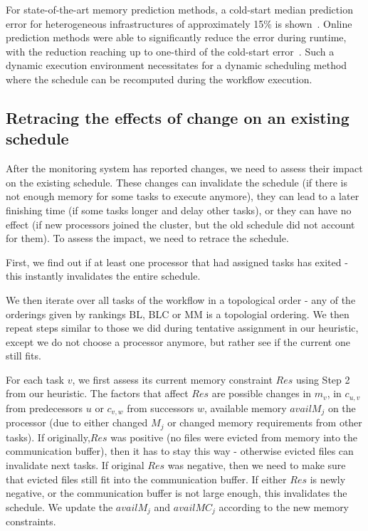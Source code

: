\documentclass[conference]{IEEEtran}
\begin{document}
    For state-of-the-art memory prediction methods, a cold-start median prediction error for heterogeneous infrastructures of approximately 15\% is shown~\cite{}.
    Online prediction methods were able to significantly reduce the error during runtime, with the reduction reaching up to one-third of the cold-start error~\cite{baderDiedrichDynamic2023,witt2019learning}.
    Such a dynamic execution environment necessitates for a dynamic scheduling method where the schedule can be recomputed during the workflow execution.

    \subsection{Retracing the effects of change on an existing schedule}
    After the monitoring system has reported changes, we need to assess their impact on the existing schedule.
    These changes can invalidate the schedule (\eg if there is not enough memory for some tasks to execute anymore),
    they can lead to a later finishing time (\eg if some tasks longer and delay other tasks), or they can have no effect (\eg if new processors
    joined the cluster, but the old schedule did not account for them).
    To assess the impact, we need to retrace the schedule.

    First, we find out if at least one processor that had assigned tasks has exited - this instantly invalidates the
    entire schedule.

    We then iterate over all tasks of the workflow in a topological order - any of the orderings given by rankings BL, BLC or MM
    is a topologial ordering.
    We then repeat steps similar to those we did during tentative assignment in our heuristic, except we do not choose a processor
    anymore, but rather see if the current one still fits.

    For each task $v$, we first assess its current memory constraint $Res$ using Step 2 from our heuristic.
    The factors that affect $Res$ are possible changes in $m_v$, in $c_{u,v}$ from predecessors $u$ or $c_{v,w}$ from successors $w$,
    available memory $availM_j$ on the processor (due to either changed $M_j$ or changed memory requirements from other tasks).
    If originally,$Res$ was positive (no files were evicted from memory into the communication buffer), then it has to stay this way -
    otherwise evicted files can invalidate next tasks.
    If original $Res$ was negative, then we need to make sure that evicted files still fit into the communication buffer.
    If either $Res$ is newly negative, or the communication buffer is not large enough, this invalidates the schedule.
    We update the $availM_j$ and $availMC_j$ according to the new memory constraints.
\end{document}
